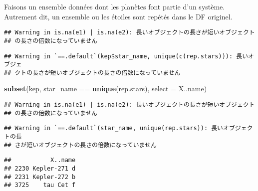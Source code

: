 \documentclass[]{article}
\newenvironment{Shaded}{\begin{snugshade}}{\end{snugshade}}
\newcommand{\KeywordTok}[1]{\textcolor[rgb]{0.13,0.29,0.53}{\textbf{{#1}}}}
\newcommand{\DataTypeTok}[1]{\textcolor[rgb]{0.13,0.29,0.53}{{#1}}}
\newcommand{\StringTok}[1]{\textcolor[rgb]{0.31,0.60,0.02}{{#1}}}
\newcommand{\NormalTok}[1]{{#1}}
\begin{document}
Faisons un ensemble données dont les planètes font partie d'un système.
Autrement dit, un ensemble ou les étoiles sont repétés dans le DF
originel.

\begin{Shaded}
\end{Shaded}

\begin{verbatim}
## Warning in is.na(e1) | is.na(e2): 長いオブジェクトの長さが短いオブジェクト
## の長さの倍数になっていません
\end{verbatim}

\begin{verbatim}
## Warning in `==.default`(kep$star_name, unique(c(rep.stars))): 長いオブジェ
## クトの長さが短いオブジェクトの長さの倍数になっていません
\end{verbatim}

\begin{Shaded}
\begin{Highlighting}[]
\KeywordTok{subset}\NormalTok{(kep, star_name ==}\StringTok{ }\KeywordTok{unique}\NormalTok{(rep.stars), }\DataTypeTok{select =} \NormalTok{X..name)}
\end{Highlighting}
\end{Shaded}

\begin{verbatim}
## Warning in is.na(e1) | is.na(e2): 長いオブジェクトの長さが短いオブジェクト
## の長さの倍数になっていません
\end{verbatim}

\begin{verbatim}
## Warning in `==.default`(star_name, unique(rep.stars)): 長いオブジェクトの長
## さが短いオブジェクトの長さの倍数になっていません
\end{verbatim}

\begin{verbatim}
##           X..name
## 2230 Kepler-271 d
## 2231 Kepler-272 b
## 3725    tau Cet f
\end{verbatim}
\end{document}
